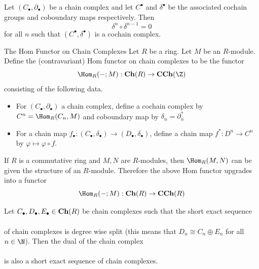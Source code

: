 \documentclass[a4paper]{article}
\begin{document}
\begin{lmm}{}{} Let $(C_\bullet,\partial_\bullet)$ be a chain complex and let $C^\bullet$ and $\delta^\bullet$ be the associated cochain groups and coboundary maps respectively. Then $$\delta^n\circ\delta^{n-1}=0$$ for all $n$ such that $(C^\bullet,\delta^\bullet)$ is a cochain complex. 
\end{lmm}

\begin{defn}{The Hom Functor on Chain Complexes}{} Let $R$ be a ring. Let $M$ be an $R$-module. Define the (contravariant) Hom functor on chain complexes to be the functor $$\Hom_R(-;M):\bold{Ch}(R)\to\bold{CCh}(\Z)$$ consisting of the following data. 
\begin{itemize}
\item For $(C_\bullet,\partial_\bullet)$ a chain complex, define a cochain complex by $C^n=\Hom_R(C_n,M)$ and coboundary map by $\delta_n=\partial_n^\ast$
\item For a chain map $f_\bullet:(C_\bullet,\delta_\bullet)\to(D_\bullet,\delta_\bullet)$, define a chain map $f^\ast:D^n\to C^n$ by $\varphi\mapsto\varphi\circ f$. 
\end{itemize}
\end{defn}

If $R$ is a commutative ring and $M,N$ are $R$-modules, then $\Hom_R(M,N)$ can be given the structure of an $R$-module. Therefore the above Hom functor upgrades into a functor $$\Hom_R(-;M):\bold{Ch}(R)\to\bold{CCh}(R)$$

\begin{prp}{}{} Let $C_\bullet,D_\bullet,E_\bullet\in\bold{Ch}(R)$ be chain complexes such that the short exact sequence \\
\\
of chain complexes is degree wise split (this means that $D_n\cong C_n\oplus E_n$ for all $n\in\N$). Then the dual of the chain complex \\
\\
is also a short exact sequence of chain complexes. 
\end{prp}
\end{document}
